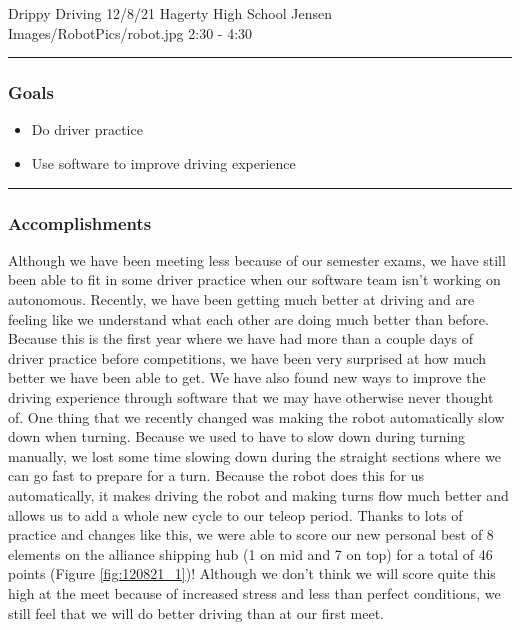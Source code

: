 \insertmeeting 
	{Drippy Driving} 
	{12/8/21} 
	{Hagerty High School}
	{Jensen}
	{Images/RobotPics/robot.jpg}
	{2:30 - 4:30}
	
\noindent\hfil\rule{\textwidth}{.4pt}\hfil
\subsubsection*{Goals}
\begin{itemize}
    \item Do driver practice
    \item Use software to improve driving experience
 

\end{itemize} 

\noindent\hfil\rule{\textwidth}{.4pt}\hfil

\subsubsection*{Accomplishments}
Although we have been meeting less because of our semester exams, we have still been able to fit in some driver practice when our software team isn’t working on autonomous. Recently, we have been getting much better at driving and are feeling like we understand what each other are doing much better than before. Because this is the first year where we have had more than a couple days of driver practice before competitions, we have been very surprised at how much better we have been able to get. We have also found new ways to improve the driving experience through software that we may have otherwise never thought of. One thing that we recently changed was making the robot automatically slow down when turning. Because we used to have to slow down during turning manually, we lost some time slowing down during the straight sections where we can go fast to prepare for a turn. Because the robot does this for us automatically, it makes driving the robot and making turns flow much better and allows us to add a whole new cycle to our teleop period. Thanks to lots of practice and changes like this, we were able to score our new personal best of 8 elements on the alliance shipping hub (1 on mid and 7 on top) for a total of 46 points (Figure \ref{fig:120821_1})! Although we don't think we will score quite this high at the meet because of increased stress and less than perfect conditions, we still feel that we will do better driving than at our first meet.

